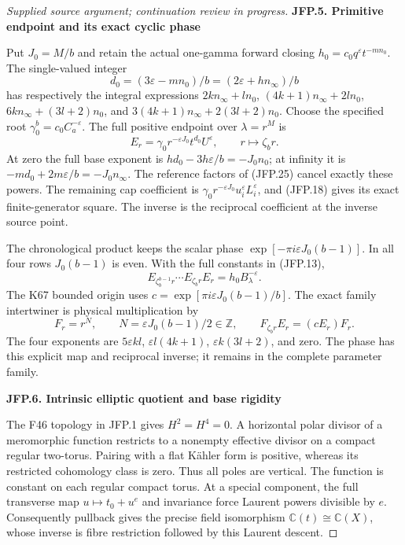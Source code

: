 \begin{proof}[Supplied source argument; continuation review in progress]
\par

\medskip\noindent\textbf{JFP.5. Primitive endpoint and its exact cyclic phase}

\par\nobreak

Put \(J_0=M/b\) and retain the actual one-gamma forward closing
\(h_0=c_0q^\varepsilon t^{-mn_0}\). The single-valued integer
\[
 d_0=(3\varepsilon-mn_0)/b=(2\varepsilon+hn_\infty)/b
\tag{JFP.26}
\]
has respectively the integral expressions
\(2kn_\infty+ln_0\),
\((4k+1)n_\infty+2ln_0\),
\(6kn_\infty+(3l+2)n_0\), and
\(3(4k+1)n_\infty+2(3l+2)n_0\).
Choose the specified root \(\gamma_0^b=c_0C_a^{-\varepsilon}\).
The full positive endpoint over \(\lambda=r^M\) is
\[
 E_r=\gamma_0r^{-\varepsilon J_0}t^{d_0}U^\varepsilon,
 \qquad r\longmapsto\zeta_b r.
\tag{JFP.27}
\]
At zero the full base exponent is
\(hd_0-3h\varepsilon/b=-J_0n_0\); at infinity it is
\(-md_0+2m\varepsilon/b=-J_0n_\infty\).
The reference factors of (JFP.25) cancel exactly these powers.
The remaining cap coefficient is
\(\gamma_0r^{-\varepsilon J_0}u_i^\varepsilon L_i^\varepsilon\),
and (JFP.18) gives its exact finite-generator square. The inverse
is the reciprocal coefficient at the inverse source point.

The chronological product keeps the scalar phase
\(\exp[-\pi i\varepsilon J_0(b-1)]\). In all four rows
\(J_0(b-1)\) is even. With the full constants in (JFP.13),
\[
 E_{\zeta_b^{b-1}r}\cdots E_{\zeta_b r}E_r
 =h_0 B_\lambda^{-\varepsilon}.
\tag{JFP.28}
\]
The K67 bounded origin uses
\(c=\exp[\pi i\varepsilon J_0(b-1)/b]\). The exact family
intertwiner is physical multiplication by
\[
 F_r=r^N,\qquad N=\varepsilon J_0(b-1)/2\in\mathbb Z,
 \qquad F_{\zeta_b r}E_r=(cE_r)F_r.
\tag{JFP.29}
\]
The four exponents are \(5\varepsilon kl\),
\(\varepsilon l(4k+1)\), \(\varepsilon k(3l+2)\), and zero.
The phase has this explicit map and reciprocal inverse; it remains
in the complete parameter family.

\par

\medskip\noindent\textbf{JFP.6. Intrinsic elliptic quotient and base rigidity}

\par\nobreak

The F46 topology in JFP.1 gives \(H^2=H^4=0\). A horizontal
polar divisor of a meromorphic function restricts to a nonempty
effective divisor on a compact regular two-torus. Pairing with a
flat Kähler form is positive, whereas its restricted cohomology
class is zero. Thus all poles are vertical. The function is
constant on each regular compact torus. At a special component,
the full transverse map \(u\mapsto t_0+u^e\) and invariance
force Laurent powers divisible by \(e\). Consequently pullback
gives the precise field isomorphism \(\mathbb C(t)\cong\mathbb C(X)\),
whose inverse is fibre restriction followed by this Laurent descent.


\end{proof}
